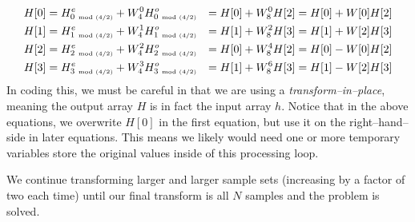 \documentclass[10pt]{article}
\begin{document}
\begin{equation}
\begin{aligned}
H[0] & = H_{0\ \mbox{\tiny mod\ (4/2)}}^e + W_4^0 H_{0\ \mbox{\tiny mod\ (4/2)}}^o 
     & = H[0] + W_8^0H[2] & = H[0] + W[0]H[2]\\
H[1] & = H_{1\ \mbox{\tiny mod\ (4/2)}}^e + W_4^1 H_{1\ \mbox{\tiny mod\ (4/2)}}^o 
     & = H[1] + W_8^2H[3] & = H[1] + W[2]H[3]\\
H[2] & = H_{2\ \mbox{\tiny mod\ (4/2)}}^e + W_4^2 H_{2\ \mbox{\tiny mod\ (4/2)}}^o
     & = H[0] + W_8^4H[2] & = H[0] - W[0]H[2]\\
H[3] & = H_{3\ \mbox{\tiny mod\ (4/2)}}^e + W_4^3 H_{3\ \mbox{\tiny mod\ (4/2)}}^o
     & = H[1] + W_8^6H[3]&  = H[1] - W[2]H[3]
\end{aligned}
\end{equation}
In coding this, we must be careful in that we are using a 
{\em transform--in--place}, meaning the output array $H$ is in
fact the input array $h$.  Notice that in the above equations, 
we overwrite $H[0]$ in the first equation, but use it on the
right--hand--side in later equations.  This means we likely would
need one or more temporary variables store the original values
inside of this processing loop.

We continue transforming larger and larger sample sets (increasing by
a factor of two each time) until our final transform is all $N$
samples and the problem is solved.
\end{document}
